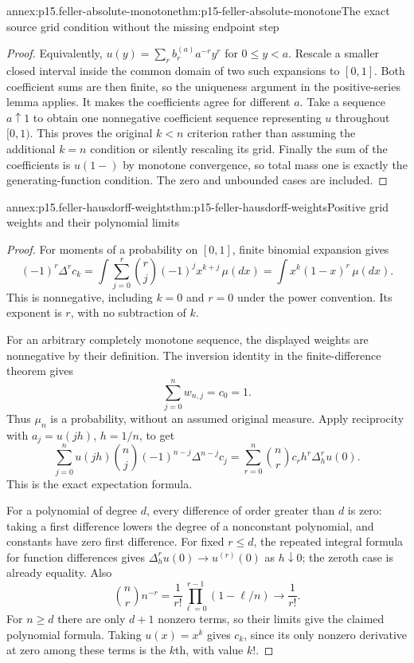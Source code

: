 \begin{annexitem}{annex:p15.feller-absolute-monotone}{thm:p15-feller-absolute-monotone}{The exact source grid condition without the missing endpoint step}
\begin{proof}
Equivalently, \(u(y)=\sum_r b_r^{(a)}a^{-r}y^r\) for \(0\leq y<a\).
Rescale a smaller closed interval inside the common domain of two
such expansions to \([0,1]\). Both coefficient sums are then finite,
so the uniqueness argument in the positive-series lemma applies.
It makes the coefficients agree for different \(a\).
Take a sequence \(a\uparrow1\) to obtain one nonnegative coefficient
sequence representing \(u\) throughout \([0,1)\).
This proves the original \(k<n\) criterion rather than assuming
the additional \(k=n\) condition or silently rescaling its grid.
Finally the sum of the coefficients is \(u(1-)\) by monotone
convergence, so total mass one is exactly the generating-function
condition. The zero and unbounded cases are included.
\end{proof}
\end{annexitem}


\begin{annexitem}{annex:p15.feller-hausdorff-weights}{thm:p15-feller-hausdorff-weights}{Positive grid weights and their polynomial limits}
\begin{proof}
For moments of a probability on \([0,1]\), finite binomial expansion gives
\[
 (-1)^r\Delta^r c_k
   =\int\sum_{j=0}^r\binom rj(-1)^j x^{k+j}\,\mu(dx)
   =\int x^k(1-x)^r\,\mu(dx).
\]
This is nonnegative, including \(k=0\) and \(r=0\) under the power
convention. Its exponent is \(r\), with no subtraction of \(k\).

For an arbitrary completely monotone sequence, the displayed weights
are nonnegative by their definition.
The inversion identity in the finite-difference theorem gives
\[
                 \sum_{j=0}^nw_{n,j}=c_0=1.
\]
Thus \(\mu_n\) is a probability, without an assumed original measure.
Apply reciprocity with \(a_j=u(jh)\), \(h=1/n\), to get
\[
 \sum_{j=0}^n u(jh)\binom nj(-1)^{n-j}\Delta^{n-j}c_j
               =\sum_{r=0}^n\binom nr c_r h^r\Delta_h^ru(0).
\]
This is the exact expectation formula.

For a polynomial of degree \(d\), every difference of order greater
than \(d\) is zero: taking a first difference lowers the degree
of a nonconstant polynomial, and constants have zero first difference.
For fixed \(r\leq d\), the repeated integral formula for function
differences gives \(\Delta_h^ru(0)\to u^{(r)}(0)\) as \(h\downarrow0\);
the zeroth case is already equality. Also
\[
                   \binom nr n^{-r}
                     =\frac1{r!}\prod_{\ell=0}^{r-1}(1-\ell/n)
                          \longrightarrow\frac1{r!}.
\]
For \(n\geq d\) there are only \(d+1\) nonzero terms, so their limits
give the claimed polynomial formula.
Taking \(u(x)=x^k\) gives \(c_k\), since its only nonzero derivative
at zero among these terms is the \(k\)th, with value \(k!\).
\end{proof}
\end{annexitem}

